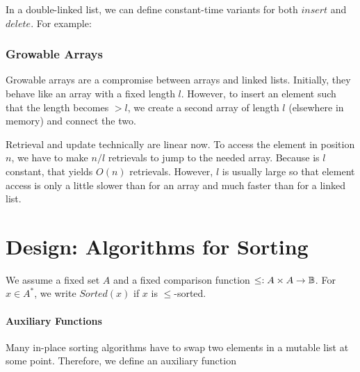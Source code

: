 In a double-linked list, we can define constant-time variants for both $insert$ and $delete$.
For example:
\begin{acode}
\end{acode}


\subsubsection{Growable Arrays}

Growable arrays are a compromise between arrays and linked lists.
Initially, they behave like an array with a fixed length $l$.
However, to insert an element such that the length becomes $>l$, we create a second array of length $l$ (elsewhere in memory) and connect the two.

Retrieval and update technically are linear now.
To access the element in position $n$, we have to make $n/l$ retrievals to jump to the needed array.
Because is $l$ constant, that yields $O(n)$ retrievals.
However, $l$ is usually large so that element access is only a little slower than for an array and much faster than for a linked list.

\section{Design: Algorithms for Sorting}\label{sec:ad:sort:algo}

We assume a fixed set $A$ and a fixed comparison function $\leq:A\times A \to \mathbb{B}$.
For $x\in A^*$, we write $Sorted(x)$ if $x$ is $\leq$-sorted.

\paragraph{Auxiliary Functions}
Many in-place sorting algorithms have to swap two elements in a mutable list at some point.
Therefore, we define an auxiliary function

\begin{acode}
\end{acode}

